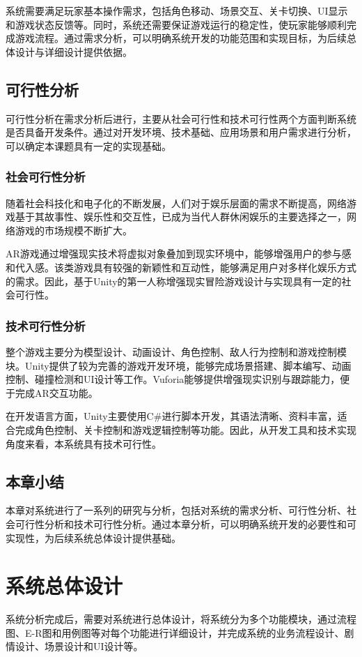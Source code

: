 \documentclass[12pt]{graduate-design-manual}
\begin{document}
系统需要满足玩家基本操作需求，包括角色移动、场景交互、关卡切换、UI显示和游戏状态反馈等。同时，系统还需要保证游戏运行的稳定性，使玩家能够顺利完成游戏流程。通过需求分析，可以明确系统开发的功能范围和实现目标，为后续总体设计与详细设计提供依据。

\subsection{可行性分析}
可行性分析在需求分析后进行，主要从社会可行性和技术可行性两个方面判断系统是否具备开发条件。通过对开发环境、技术基础、应用场景和用户需求进行分析，可以确定本课题具有一定的实现基础。

\subsubsection{社会可行性分析}
随着社会科技化和电子化的不断发展，人们对于娱乐层面的需求不断提高，网络游戏基于其故事性、娱乐性和交互性，已成为当代人群休闲娱乐的主要选择之一，网络游戏的市场规模不断扩大。

AR游戏通过增强现实技术将虚拟对象叠加到现实环境中，能够增强用户的参与感和代入感。该类游戏具有较强的新颖性和互动性，能够满足用户对多样化娱乐方式的需求。因此，基于Unity的第一人称增强现实冒险游戏设计与实现具有一定的社会可行性。

\subsubsection{技术可行性分析}
整个游戏主要分为模型设计、动画设计、角色控制、敌人行为控制和游戏控制模块。Unity提供了较为完善的游戏开发环境，能够完成场景搭建、脚本编写、动画控制、碰撞检测和UI设计等工作。Vuforia能够提供增强现实识别与跟踪能力，便于完成AR交互功能。

在开发语言方面，Unity主要使用C\#进行脚本开发，其语法清晰、资料丰富，适合完成角色控制、关卡控制和游戏逻辑控制等功能。因此，从开发工具和技术实现角度来看，本系统具有技术可行性。

\subsection{本章小结}
本章对系统进行了一系列的研究与分析，包括对系统的需求分析、可行性分析、社会可行性分析和技术可行性分析。通过本章分析，可以明确系统开发的必要性和可实现性，为后续系统总体设计提供基础。

\section{系统总体设计}
系统分析完成后，需要对系统进行总体设计，将系统分为多个功能模块，通过流程图、E-R图和用例图等对每个功能进行详细设计，并完成系统的业务流程设计、剧情设计、场景设计和UI设计等。
\end{document}
